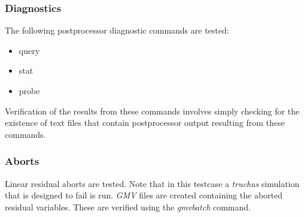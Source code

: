 \documentclass[12pt]{article}
\begin{document}
\subsubsection*{Diagnostics}

The following postprocessor diagnostic commands are tested:
\begin{itemize}
\item query
\item stat
\item probe
\end{itemize}

Verification of the results from these commands involves simply checking
for the existence of text files that contain postprocessor output resulting 
from these commands.

\subsubsection*{Aborts}

Linear residual aborts are tested. Note that in this testcase a {\em{truchas}}
simulation that is designed to fail is run. {\em{GMV}} files are created
containing the aborted residual variables. These are verified using the
{\em{gmvbatch}} command. 
\end{document}
